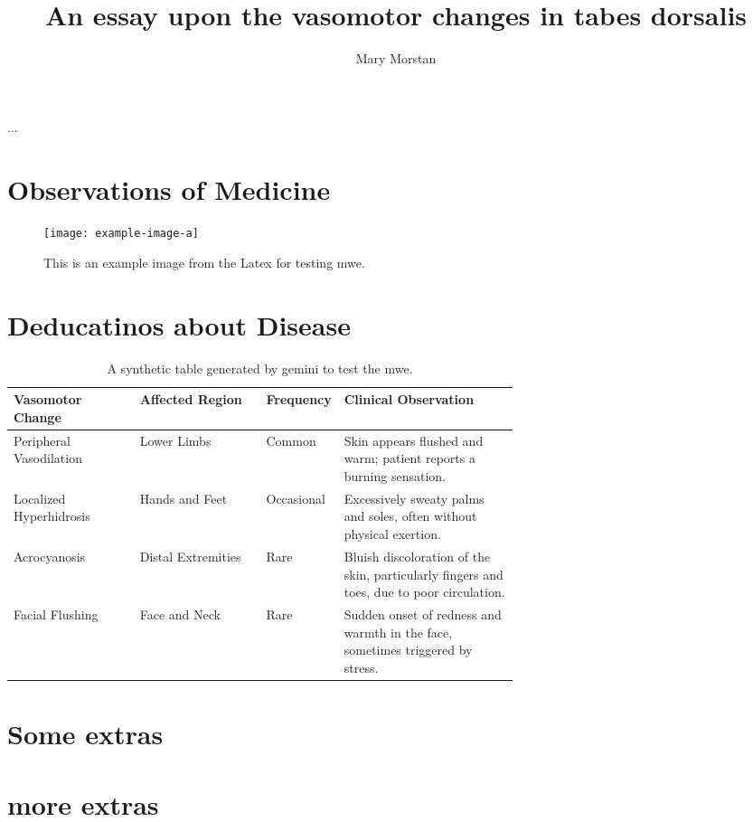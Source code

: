\documentclass[jdecimal, citestyle=apa, 11pt]{maine-thesis}  %
\title{An essay upon the vasomotor changes in tabes dorsalis}					%
\author{Mary Morstan}					%
\begin{document}
\preliminary
\titlepage

\begin{abstract}
\Blindtext
\end{abstract}

\begin{layabstract}{...}	%
\blindtext
\end{layabstract}

\tableofcontents
\listoftables				%
\listoffigures				%

\mainmatter


\chapter{Observations of Medicine}
\blindtext
\begin{figure}[]
    \centering
    \texttt{[image: example-image-a]}
    \caption[Short Title for My Example Figure]{This is an example image from the Latex for testing mwe. \blindtext}
    \label{fig:example-a}
\end{figure}

\chapter{Deducatinos about Disease}
\blindtext
\begin{table}[h!]
    \centering
    \begin{tabularx}{\linewidth}{p{0.25\linewidth}p{0.25\linewidth}p{0.15\linewidth}X}
        \toprule
        \textbf{Vasomotor Change} & \textbf{Affected Region} & \textbf{Frequency} & \textbf{Clinical Observation} \\
        \midrule
        Peripheral Vasodilation & Lower Limbs & Common & Skin appears flushed and warm; patient reports a burning sensation. \\
        Localized Hyperhidrosis & Hands and Feet & Occasional & Excessively sweaty palms and soles, often without physical exertion. \\
        Acrocyanosis & Distal Extremities & Rare & Bluish discoloration of the skin, particularly fingers and toes, due to poor circulation. \\
        Facial Flushing & Face and Neck & Rare & Sudden onset of redness and warmth in the face, sometimes triggered by stress. \\
        \bottomrule
    \end{tabularx}
    \caption[Vasomotor Changes in Tabes Dorsalis]{A synthetic table generated by gemini to test the mwe.}
    \label{tab:vasomotor_changes2}
\end{table}

\appendix					%
\chapter{Some extras}
\blindtext
\chapter{more extras}
\blindtext
\end{document}
